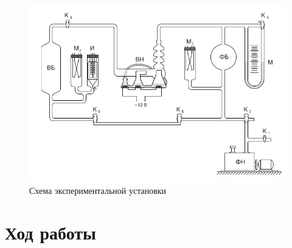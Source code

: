 \documentclass[12pt]{article}
\begin{document}
    \begin{figure}[H]
        \centering
        \includegraphics[scale=2]{stand.png}
        \caption{Схема экспериментальной установки}
        \label{facility}
    \end{figure}
    
    \section{Ход работы}
\end{document}
